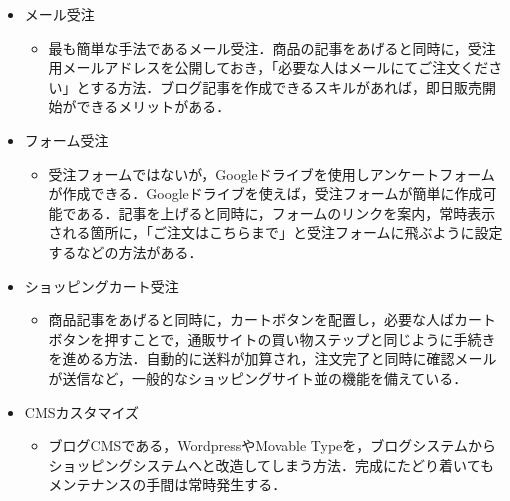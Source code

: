 \begin{itemize}

 \item	メール受注

\begin{itemize}
\setlength{\parskip}{3mm}

 \item	最も簡単な手法であるメール受注．商品の記事をあげると同時に，受注用メールアドレスを公開しておき，「必要な人はメールにてご注文ください」とする方法．ブログ記事を作成できるスキルがあれば，即日販売開始ができるメリットがある．

\end{itemize}

 \item	フォーム受注

\begin{itemize}
\setlength{\parskip}{3mm}

 \item	受注フォームではないが，Googleドライブを使用しアンケートフォームが作成できる．Googleドライブを使えば，受注フォームが簡単に作成可能である．記事を上げると同時に，フォームのリンクを案内，常時表示される箇所に，「ご注文はこちらまで」と受注フォームに飛ぶように設定するなどの方法がある．

\end{itemize}

 \item	ショッピングカート受注

\begin{itemize}
\setlength{\parskip}{3mm}

 \item	商品記事をあげると同時に，カートボタンを配置し，必要な人ばカートボタンを押すことで，通販サイトの買い物ステップと同じように手続きを進める方法．自動的に送料が加算され，注文完了と同時に確認メールが送信など，一般的なショッピングサイト並の機能を備えている．

\end{itemize}

 \item	CMSカスタマイズ

\begin{itemize}
\setlength{\parskip}{3mm}

 \item	ブログCMSである，WordpressやMovable Typeを，ブログシステムからショッピングシステムへと改造してしまう方法．完成にたどり着いてもメンテナンスの手間は常時発生する．

\end{itemize}	

\end{itemize}


